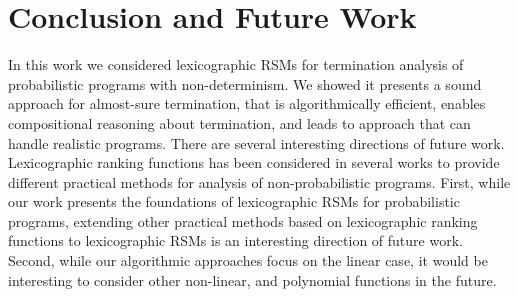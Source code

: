 \section{Conclusion and Future Work}
\vspace{-0.5em}
In this work we considered lexicographic RSMs for termination analysis of probabilistic
programs with non-determinism.
We showed it presents a sound approach for almost-sure termination, that is
algorithmically efficient, enables compositional reasoning about termination, 
and leads to approach that can handle realistic programs.
There are several interesting directions of future work.
Lexicographic ranking functions has been considered in several works to 
provide different practical methods for analysis of non-probabilistic programs.
First, while our work presents the foundations of lexicographic RSMs for probabilistic 
programs, extending other practical methods based on lexicographic ranking 
functions to 
lexicographic RSMs is an interesting direction of future work.
Second, while our algorithmic approaches focus on the linear case, it would be interesting
to consider other non-linear, and polynomial functions in the future.





